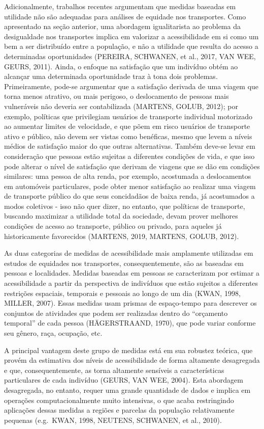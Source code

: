 \documentclass[msc,numbers]{coppe}
\begin{document}
  Adicionalmente, trabalhos recentes argumentam que medidas baseadas em utilidade não são adequadas para análises de equidade nos transportes. Como apresentado na seção anterior, uma abordagem igualitarista ao problema da desigualdade nos transportes implica em valorizar a acessibilidade em si como um bem a ser distribuído entre a população, e não a utilidade que resulta do acesso a determinadas oportunidades (PEREIRA, SCHWANEN, et al., 2017, VAN WEE, GEURS, 2011). Ainda, o enfoque na satisfação que um indivíduo obtém ao alcançar uma determinada oportunidade traz à tona dois problemas. Primeiramente, pode-se argumentar que a satisfação derivada de uma viagem que torna menos atrativo, ou mais perigoso, o deslocamento de pessoas mais vulneráveis não deveria ser contabilizada (MARTENS, GOLUB, 2012); por exemplo, políticas que privilegiam usuários de transporte individual motorizado ao aumentar limites de velocidade, e que põem em risco usuários de transporte ativo e público, não devem ser vistas como benéficas, mesmo que levem a níveis médios de satisfação maior do que outras alternativas. Também deve-se levar em consideração que pessoas estão sujeitas a diferentes condições de vida, e que isso pode alterar o nível de satisfação que derivam de viagens que se dão em condições similares: uma pessoa de alta renda, por exemplo, acostumada a deslocamentos em automóveis particulares, pode obter menor satisfação ao realizar uma viagem de transporte público do que seus concidadãos de baixa renda, já acostumados a modos coletivos - isso não quer dizer, no entanto, que políticas de transporte, buscando maximizar a utilidade total da sociedade, devam prover melhores condições de acesso ao transporte, público ou privado, para aqueles já historicamente favorecidos (MARTENS, 2019, MARTENS, GOLUB, 2012).

  As duas categorias de medidas de acessibilidade mais amplamente utilizadas em estudos de equidades nos transportes, consequentemente, são as baseadas em pessoas e localidades. Medidas baseadas em pessoas se caracterizam por estimar a acessibilidade a partir da perspectiva de indivíduos que estão sujeitos a diferentes restrições espaciais, temporais e pessoais ao longo de um dia (KWAN, 1998, MILLER, 2007). Essas medidas usam prismas de espaço-tempo para descrever os conjuntos de atividades que podem ser realizadas dentro do ``orçamento temporal'' de cada pessoa (HÄGERSTRAAND, 1970), que pode variar conforme seu gênero, raça, ocupação, etc.

  A principal vantagem deste grupo de medidas está em sua robustez teórica, que provém da estimativa dos níveis de acessibilidade de forma altamente desagregada e que, consequentemente, as torna altamente sensíveis a características particulares de cada indivíduo (GEURS, VAN WEE, 2004). Esta abordagem desagregada, no entanto, requer uma grande quantidade de dados e implica em operações computacionalmente muito intensivas, o que acaba restringindo aplicações dessas medidas a regiões e parcelas da população relativamente pequenas (e.g.~KWAN, 1998, NEUTENS, SCHWANEN, et al., 2010).
\end{document}

